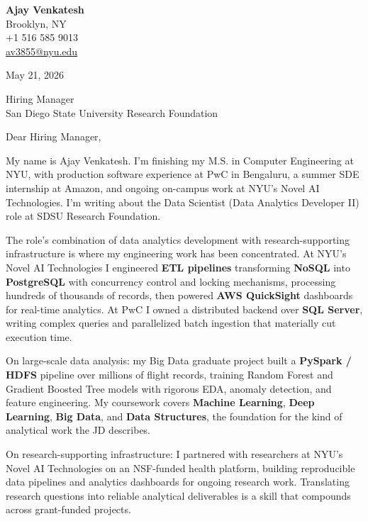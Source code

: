 \documentclass[letterpaper,11pt]{article}
\begin{document}
\begin{flushleft}
\textbf{\large Ajay Venkatesh} \\
Brooklyn, NY \\
+1 516 585 9013 \\
\href{mailto:av3855@nyu.edu}{av3855@nyu.edu}
\end{flushleft}
\vspace{10pt}
May 21, 2026
\vspace{6pt}

Hiring Manager \\
San Diego State University Research Foundation

\vspace{10pt}

Dear Hiring Manager,

My name is Ajay Venkatesh. I'm finishing my M.S. in Computer Engineering at NYU, with production software experience at PwC in Bengaluru, a summer SDE internship at Amazon, and ongoing on-campus work at NYU's Novel AI Technologies. I'm writing about the Data Scientist (Data Analytics Developer II) role at SDSU Research Foundation.

The role's combination of data analytics development with research-supporting infrastructure is where my engineering work has been concentrated. At NYU's Novel AI Technologies I engineered \textbf{ETL pipelines} transforming \textbf{NoSQL} into \textbf{PostgreSQL} with concurrency control and locking mechanisms, processing hundreds of thousands of records, then powered \textbf{AWS QuickSight} dashboards for real-time analytics. At PwC I owned a distributed backend over \textbf{SQL Server}, writing complex queries and parallelized batch ingestion that materially cut execution time.

On large-scale data analysis: my Big Data graduate project built a \textbf{PySpark / HDFS} pipeline over millions of flight records, training Random Forest and Gradient Boosted Tree models with rigorous EDA, anomaly detection, and feature engineering. My coursework covers \textbf{Machine Learning}, \textbf{Deep Learning}, \textbf{Big Data}, and \textbf{Data Structures}, the foundation for the kind of analytical work the JD describes.

On research-supporting infrastructure: I partnered with researchers at NYU's Novel AI Technologies on an NSF-funded health platform, building reproducible data pipelines and analytics dashboards for ongoing research work. Translating research questions into reliable analytical deliverables is a skill that compounds across grant-funded projects.
\end{document}
